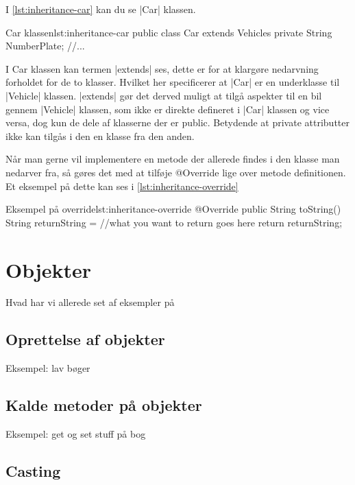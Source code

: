 I \autoref{lst:inheritance-car} kan du se \JavaInline|Car| klassen.

\begin{JavaCode}{Car klassen}{lst:inheritance-car}
	public class Car extends Vehicles
	{
		private String NumberPlate;
		//...
	}
\end{JavaCode}

I Car klassen kan termen \JavaInline|extends| ses, dette er for at klargøre nedarvning forholdet for de to klasser. Hvilket her specificerer at \JavaInline|Car| er en underklasse til \JavaInline|Vehicle| klassen. \JavaInline|extends| gør det derved muligt at tilgå aspekter til en bil gennem \JavaInline|Vehicle| klassen, som ikke er direkte defineret i \JavaInline|Car| klassen og vice versa, dog kun de dele af klasserne der er public. Betydende at private attributter ikke kan tilgås i den en klasse fra den anden.

Når man gerne vil implementere en metode der allerede findes i den klasse man nedarver fra, så gøres det med at tilføje @Override lige over metode definitionen. Et eksempel på dette kan ses i \autoref{lst:inheritance-override}

\begin{JavaCode}{Eksempel på override}{lst:inheritance-override}
	@Override
	public String toString() {
		String returnString = //what you want to return goes here
		return returnString;
	}
\end{JavaCode}

\section{Objekter}

Hvad har vi allerede set af eksempler på

\subsection{Oprettelse af objekter}

Eksempel: lav bøger

\subsection{Kalde metoder på objekter}

Eksempel: get og set stuff på bog

\subsection{Casting}

